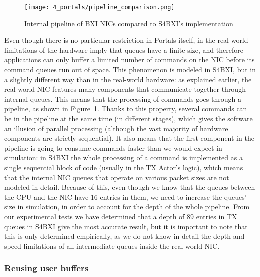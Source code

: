\begin{figure}[!ht]
    \centering
    \texttt{[image: 4\_portals/pipeline\_comparison.png]}
    \caption{Internal pipeline of BXI NICs compared to S4BXI's implementation}
    \label{fig:4_portals:pipeline_comparison}
\end{figure}

Even though there is no particular restriction in Portals itself, in the real
world limitations of the hardware imply that queues have a finite size, and
therefore applications can only buffer a limited number of commands on the NIC
before its command queues run out of space. This phenomenon is modeled in S4BXI,
but in a slightly different way than  in the real-world hardware: as explained
earlier, the real-world NIC features many components that communicate together
through internal queues. This means that the processing of commands goes through
a pipeline, as shown in Figure~\ref{fig:4_portals:pipeline_comparison}. Thanks
to this property, several commands can be in the pipeline at the same time (in
different stages), which gives the software an illusion of parallel processing
(although the vast majority of hardware components are strictly sequential). It
also means that the first component in the pipeline is going to consume commands
faster than we would expect in simulation: in S4BXI the whole processing of a
command is implemented as a single sequential block of code (usually in the TX
Actor's logic), which means that the internal NIC queues that operate on various
packet sizes are not modeled in detail. Because of this, even though we know
that the queues between the CPU and the NIC have 16 entries in them, we need to
increase the queues' size in simulation, in order to account for the depth of
the whole pipeline. From our experimental tests we have determined that a depth
of 89 entries in TX queues in S4BXI give the most accurate result, but it is
important to note that this is only determined empirically, as we do not know in
detail the depth and speed limitations of all intermediate queues inside the
real-world NIC.

\subsubsection{Reusing user buffers}

